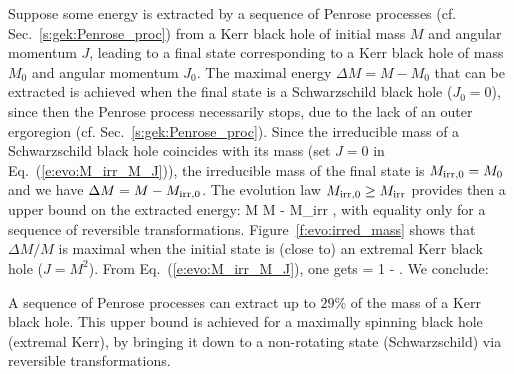 Suppose some energy is extracted by a sequence of Penrose processes
(cf. Sec.~\ref{s:gek:Penrose_proc}) from a Kerr black hole of initial mass $M$ and angular momentum $J$,
leading to a final state corresponding to a Kerr black hole of mass $M_0$ and angular
momentum $J_0$. The maximal energy $\Delta M = M - M_0$ that can be extracted is achieved when the
final state is a Schwarzschild black hole ($J_0=0$), since then the Penrose process
necessarily stops, due to the lack of an outer ergoregion (cf. Sec.~\ref{s:gek:Penrose_proc}).
Since the irreducible mass of a Schwarzschild black hole coincides with its mass
(set $J=0$ in Eq.~(\ref{e:evo:M_irr_M_J})), the irreducible mass
of the final state is $M_{{\rm irr},0} = M_0$ and we have $\Delta M = M - M_{{\rm irr},0}$.
The evolution law $M_{{\rm irr},0} \geq M_{\rm irr}$ provides then a upper bound
on the extracted energy:
\be
    \Delta M \leq M - M_{\rm irr} ,
\ee
with equality only for a sequence of reversible transformations.
Figure~\ref{f:evo:irred_mass} shows that $\Delta M/M$ is maximal when the
initial state is (close to) an extremal Kerr black hole ($J=M^2$). From
Eq.~(\ref{e:evo:M_irr_M_J}), one gets
\be
    \max {} = 1 -   .
\ee
We conclude:
\begin{prop}
A sequence of Penrose processes can extract up to $29 \%$ of the mass
of a Kerr black hole. This upper bound is achieved for
a maximally spinning black hole (extremal Kerr), by bringing it down to a non-rotating
state (Schwarzschild) via reversible transformations.
\end{prop}

